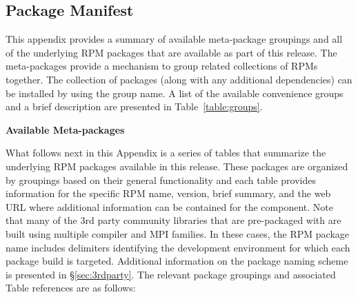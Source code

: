 \clearpage

\newcommand{\captionSpace}{-0.15cm}
\newcommand{\tabSpaceBot}{1.0cm}
\captionsetup{justification=raggedright,singlelinecheck=false}

\subsection{Package Manifest} \label {appendix:manifest}

\vspace*{0.25cm}
This appendix provides a summary of available meta-package groupings and all of the
underlying RPM packages that are available as part of this \OHPC{} release. The
meta-packages provide a mechanism to group related collections of RPMs
together. The collection of packages (along with any additional dependencies)
can be installed by using the group name. A list of the available convenience
groups and a brief description are presented in Table~\ref{table:groups}.

\vspace*{1.25cm}
\begin{table}[h] 
\caption{\bf Available \OHPC{} Meta-packages} \vspace*{\captionSpace{}}
\label{table:groups}

\end{table}

\newpage
What follows next in this Appendix is a series of tables that summarize the
underlying RPM packages available in this \OHPC{} release. These packages are
organized by groupings based on their general functionality and each table
provides information for the specific RPM name, version, brief summary, and the
web URL where additional information can be contained for the component. Note
that many of the 3rd party community libraries that are pre-packaged
with \OHPC{} are built using multiple compiler and MPI families. In these cases,
the RPM package name includes delimiters identifying the development
environment for which each package build is targeted.  Additional information
on the \OHPC{} package naming scheme is presented in \S\ref{sec:3rdparty}. 
The relevant package groupings and associated Table references are as follows:

\vspace*{0.1cm}

